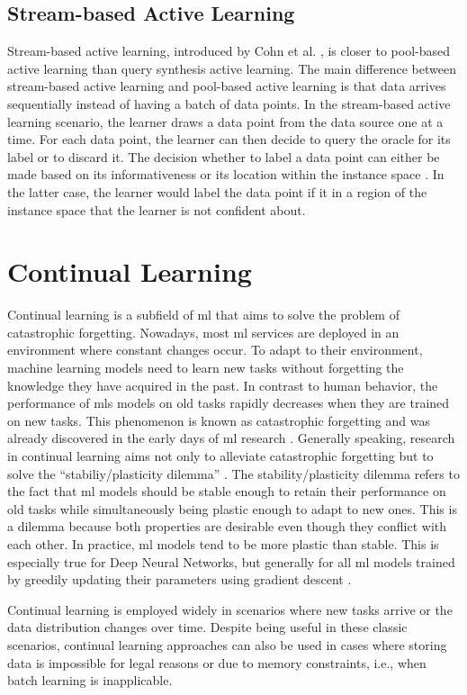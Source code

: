 \subsection{Stream-based Active Learning}
\label{sec:StreamBasedActiveLearning}
Stream-based active learning, introduced by Cohn et al. \cite{cohn1994improving}, is closer to pool-based active learning than query synthesis
active learning. The main difference between stream-based active learning and pool-based active learning is that data arrives sequentially
instead of having a batch of data points. In the stream-based active learning scenario, the learner draws a data point from the data source
one at a time. For each data point, the learner can then decide to query the oracle for its label or to discard it. The decision whether to label a
data point can either be made based on its informativeness \cite{dagan1995committee} or its location within the instance space \cite{cohn1994improving}.
In the latter case, the learner would label the data point if it in a region of the instance space that the learner is not confident about.

\section{Continual Learning}
\label{sec:ContinualLearning}
Continual learning is a subfield of \gls{ml} that aims to solve the problem of catastrophic forgetting. Nowadays, most \gls{ml} services are deployed
in an environment where constant changes occur. To adapt to their environment, machine learning models need to learn new tasks without forgetting the knowledge
they have acquired in the past. In contrast to human behavior, the performance of \gls{mls} models on old tasks rapidly decreases when they are trained
on new tasks. This phenomenon is known as catastrophic forgetting and was already discovered in the early days of \gls{ml} research \cite{mccloskey1989catastrophic}.
Generally speaking, research in continual learning aims not only to alleviate catastrophic forgetting but to solve the 
\enquote{stabiliy/plasticity dilemma} \cite{carpenter1988art}. The stability/plasticity dilemma refers to the fact that \gls{ml} models
should be stable enough to retain their performance on old tasks while simultaneously being plastic enough to adapt to new ones. This is a dilemma
because both properties are desirable even though they conflict with each other. In practice, \gls{ml} models tend to be more plastic than stable.
This is especially true for Deep Neural Networks, but generally for all \gls{ml} models trained by greedily updating their parameters using
gradient descent \cite{mundt2020wholistic}. \par
Continual learning is employed widely in scenarios where new tasks arrive or the data distribution changes over time. Despite being useful
in these classic scenarios, continual learning approaches can also be used in cases where storing data is impossible for legal reasons or due to memory
constraints, i.e., when batch learning is inapplicable. 


